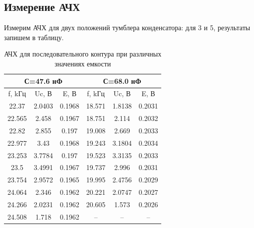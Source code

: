 \documentclass[a4paper, 12pt]{article}%
\begin{document}
	\subsection*{Измерение АЧХ}
	Измерим АЧХ для двух положений тумблера конденсатора: для 3 и 5, результаты запишем в таблицу.\\
	\begin{table}[H]
		\centering
		\begin{tabular}{|ccc|ccc|}
			\hline
			\multicolumn{3}{|c|}{С=47.6 нФ}                                        & \multicolumn{3}{c|}{С=68.0 нФ}                                        \\ \hline
			\multicolumn{1}{|c|}{f, kГц} & \multicolumn{1}{c|}{Uc, В}     & E, В      & \multicolumn{1}{c|}{f, kГц} & \multicolumn{1}{c|}{Uc, В}     & E, В      \\ \hline
			\multicolumn{1}{|c|}{22.37}  & \multicolumn{1}{c|}{2.0403} & 0.1968 & \multicolumn{1}{c|}{18.571} & \multicolumn{1}{c|}{1.8138} & 0.2031 \\ \hline
			\multicolumn{1}{|c|}{22.565} & \multicolumn{1}{c|}{2.458}  & 0.1967 & \multicolumn{1}{c|}{18.751} & \multicolumn{1}{c|}{2.114}  & 0.2032 \\ \hline
			\multicolumn{1}{|c|}{22.82}  & \multicolumn{1}{c|}{2.855}  & 0.197  & \multicolumn{1}{c|}{19.008} & \multicolumn{1}{c|}{2.669}  & 0.2033 \\ \hline
			\multicolumn{1}{|c|}{22.977} & \multicolumn{1}{c|}{3.43}   & 0.1968 & \multicolumn{1}{c|}{19.243} & \multicolumn{1}{c|}{3.1804} & 0.2034 \\ \hline
			\multicolumn{1}{|c|}{23.253} & \multicolumn{1}{c|}{3.7784} & 0.197  & \multicolumn{1}{c|}{19.523} & \multicolumn{1}{c|}{3.3135} & 0.2033 \\ \hline
			\multicolumn{1}{|c|}{23.5}   & \multicolumn{1}{c|}{3.4991} & 0.1967 & \multicolumn{1}{c|}{19.737} & \multicolumn{1}{c|}{2.996}  & 0.2031 \\ \hline
			\multicolumn{1}{|c|}{23.754} & \multicolumn{1}{c|}{2.9572} & 0.1965 & \multicolumn{1}{c|}{19.995} & \multicolumn{1}{c|}{2.4756} & 0.2029 \\ \hline
			\multicolumn{1}{|c|}{24.064} & \multicolumn{1}{c|}{2.346}  & 0.1962 & \multicolumn{1}{c|}{20.221} & \multicolumn{1}{c|}{2.0747} & 0.2027 \\ \hline
			\multicolumn{1}{|c|}{24.266} & \multicolumn{1}{c|}{2.0231} & 0.1962 & \multicolumn{1}{c|}{20.605} & \multicolumn{1}{c|}{1.573}  & 0.2026 \\ \hline
			\multicolumn{1}{|c|}{24.508} & \multicolumn{1}{c|}{1.718}  & 0.1962 & \multicolumn{1}{c|}{--}       & \multicolumn{1}{c|}{--}      &    --  \\ \hline
		\end{tabular}
		\caption{АЧХ для последовательного контура при различных значениях емкости}
	\end{table}
\end{document}
